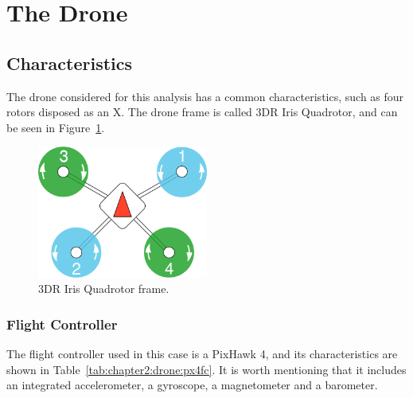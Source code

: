 \section{The Drone}
\label{sec:chapter2:drone}
\subsection{Characteristics}
\label{subsec:chapter2:drone:characteristics}
The drone considered for this analysis has a common characteristics, such as four rotors disposed as an X. The drone frame is called 3DR Iris Quadrotor, and can be seen in Figure~\ref{fig:chapter2:drone:frame}.

\begin{figure}
    \centering
    \includegraphics[width=0.5\textwidth]{Images/fig4-quad-frame.png}
    \caption{3DR Iris Quadrotor frame.}
    \label{fig:chapter2:drone:frame}
\end{figure}

\subsubsection{Flight Controller}
The flight controller used in this case is a PixHawk 4, and its characteristics are shown in Table~\ref{tab:chapter2:drone:px4fc}. It is worth mentioning that it includes an integrated accelerometer, a gyroscope, a magnetometer and a barometer.

